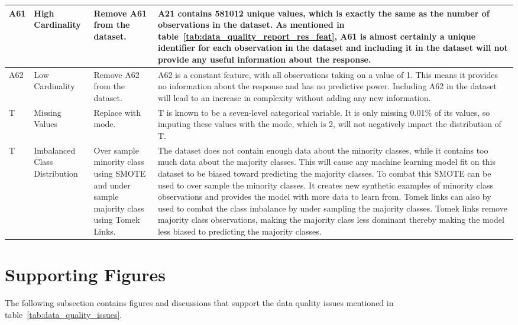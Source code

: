 \documentclass[11pt]{report}
\begin{document}
\begin{longtable}{p{2cm}p{3cm}p{4cm}p{6cm}}
\midrule
A61 & High Cardinality & Remove A61 from the dataset. & A21 contains 581012 unique values, which is exactly the same as the number of observations in the dataset. As mentioned in table~\ref{tab:data_quality_report_res_feat}, A61 is almost certainly a unique identifier for each observation in the dataset and including it in the dataset will not provide any useful information about the response. \\
\midrule
A62 & Low Cardinality & Remove A62 from the dataset. & A62 is a constant feature, with all observations taking on a value of 1. This means it provides no information about the response and has no predictive power. Including A62 in the dataset will lead to an increase in complexity without adding any new information. \\
\midrule
T & Missing Values & Replace with mode. & T is known to be a seven-level categorical variable. It is only missing 0.01\% of its values, so imputing these values with the mode, which is 2, will not negatively impact the distribution of T. \\
\midrule
T & Imbalanced Class Distribution & Over sample minority class using SMOTE and under sample majority class using Tomek Links. & The dataset does not contain enough data about the minority classes, while it contains too much data about the majority classes. This will cause any machine learning model fit on this dataset to be biased toward predicting the majority classes. To combat this SMOTE can be used to over sample the minority classes. It creates new synthetic examples of minority class observations and provides the model with more data to learn from. Tomek links can also by used to combat the class imbalance by under sampling the majority classes. Tomek links remove majority class observations, making the majority class less dominant thereby making the model less biased to predicting the majority classes. \\
\end{longtable}


\section*{Supporting Figures}

The following subsection contains figures and discussions that support the data quality issues mentioned in table~\ref{tab:data_quality_issues}.
\end{document}
